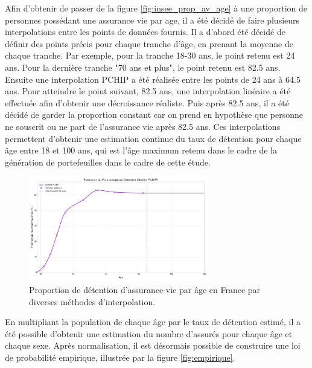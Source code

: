 Afin d'obtenir de passer de la figure \ref{fig:insee_prop_av_age} à une proportion de personnes possédant une assurance vie par age, il a été décidé de faire plusieurs interpolations entre les points de données fournis. 
Il a d'abord été décidé de définir des points précis pour chaque tranche d'âge, en prenant la moyenne de chaque tranche. Par exemple, pour la tranche 18-30 ans, le point retenu est 24 ans. Pour la dernière tranche "70 ans et plus", le point retenu est 82.5 ans. Ensuite une interpolation PCHIP a été réalisée entre les points de 24 ans à 64.5 ans. Pour atteindre le point suivant, 82.5 ans, une interpolation linéaire a été effectuée afin d'obtenir une décroissance réaliste. Puis après 82.5 ans, il a été décidé de garder la proportion constant car on prend en hypothèse que personne ne souscrit ou ne part de l'assurance vie après 82.5 ans.
Ces interpolations permettent d'obtenir une estimation continue du taux de détention pour chaque âge entre 18 et 100 ans, qui est l'âge maximum retenu dans le cadre de la génération de portefeuilles dans le cadre de cette étude. 
\begin{figure}[H]
\centering
\includegraphics[width=0.7\textwidth]{images/2_chapitres/chapitre3/interpolation_prop_age.png}
\caption{Proportion de détention d'assurance-vie par âge en France par diverses méthodes d'interpolation.}
\label{fig:interpolation_prop_age}
\end{figure}


En multipliant la population de chaque âge par le taux de détention estimé, il a été possible d'obtenir une estimation du nombre d'assurés pour chaque âge et chaque sexe. Après normalisation, il est désormais possible de construire une loi de probabilité empirique, illustrée par la figure \ref{fig:empirique}.


